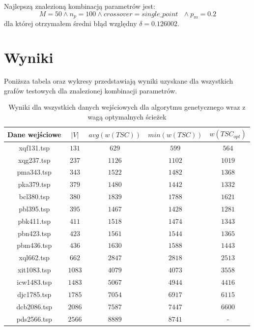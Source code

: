 \documentclass[12pt]{article}
\begin{document}
    \noindent Najlepszą znalezioną kombinacją parametrów jest:
    $$M = 50 \land n_p = 100 \land crossover = single\_point \text{ } \land p_m = 0.2$$
    dla której otrzymałem średni błąd względny $\delta = 0.126002$.

\newpage

\section*{Wyniki}

    Poniższa tabela oraz wykresy przedstawiają wyniki uzyskane dla wszystkich grafów testowych dla
    znalezionej kombinacji parametrów.

    \begin{table}[h!]
    \centering
    \begin{tabularx}{0.73\textwidth}{| c | c | c | c | c |}
        \hline
        Dane wejściowe & $|V|$ & $avg(w(TSC))$ & $min(w(TSC))$ & $w(TSC_{opt})$ \\
        \hline
        xqf131.tsp  & $131$  & $629$  & $599$  & $564$  \\
        xqg237.tsp  & $237$  & $1126$ & $1102$ & $1019$ \\
        pma343.tsp  & $343$  & $1522$ & $1482$ & $1368$ \\
        pka379.tsp  & $379$  & $1480$ & $1442$ & $1332$ \\
        bcl380.tsp  & $380$  & $1839$ & $1788$ & $1621$ \\
        pbl395.tsp  & $395$  & $1467$ & $1428$ & $1281$ \\
        pbk411.tsp  & $411$  & $1518$ & $1474$ & $1343$ \\
        pbn423.tsp  & $423$  & $1561$ & $1544$ & $1365$ \\
        pbm436.tsp  & $436$  & $1630$ & $1588$ & $1443$ \\
        xql662.tsp  & $662$  & $2847$ & $2818$ & $2513$ \\
        xit1083.tsp & $1083$ & $4079$ & $4073$ & $3558$ \\
        icw1483.tsp & $1483$ & $5067$ & $4944$ & $4416$ \\
        djc1785.tsp & $1785$ & $7054$ & $6917$ & $6115$ \\
        dcb2086.tsp & $2086$ & $7587$ & $7447$ & $6600$ \\
        pds2566.tsp & $2566$ & $8889$ & $8741$ & -      \\
        \hline
    \end{tabularx}
    \label{table:ga_results}
    \caption{Wyniki dla wszystkich danych wejściowych dla algorytmu genetycznego wraz z
    wagą optymalnych ścieżek}
    \end{table}
\end{document}
